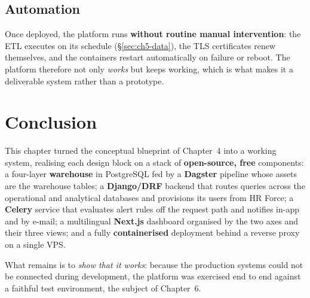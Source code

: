 \subsection{Automation}

Once deployed, the platform runs \textbf{without routine manual intervention}: the ETL executes on its
schedule (\S\ref{sec:ch5-data}), the TLS certificates renew themselves, and the containers restart
automatically on failure or reboot. The platform therefore not only \emph{works} but keeps working,
which is what makes it a deliverable system rather than a prototype.

\section*{Conclusion}

This chapter turned the conceptual blueprint of Chapter~4 into a working system, realising each design
block on a stack of \textbf{open-source, free} components: a four-layer \textbf{warehouse} in PostgreSQL
fed by a \textbf{Dagster} pipeline whose assets are the warehouse tables; a \textbf{Django/DRF} backend
that routes queries across the operational and analytical databases and provisions its users from HR
Force; a \textbf{Celery} service that evaluates alert rules off the request path and notifies in-app and
by e-mail; a multilingual \textbf{Next.js} dashboard organised by the two axes and their three views;
and a fully \textbf{containerised} deployment behind a reverse proxy on a single VPS.

What remains is to \emph{show that it works}: because the production systems could not be connected
during development, the platform was exercised end to end against a faithful test environment, the
subject of Chapter~6.
